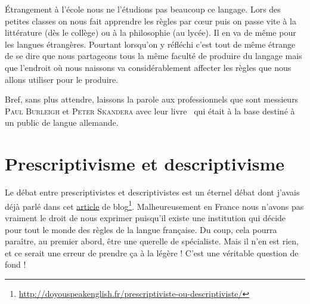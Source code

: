 \'Etrangement à l'école nous ne l'étudions pas beaucoup ce
 langage. Lors des petites classes on nous fait apprendre les règles
 par c{\oe}ur puis on passe vite à la littérature (dès le collège) ou
 à la philosophie (au lycée). Il en va de même pour les langues
 étrangères. Pourtant lorsqu'on y réfléchi c'est tout de même étrange
 de se dire que nous partageons tous la même faculté de produire du
 langage mais que l'endroit où nous naissons va considérablement
 affecter les règles que nous allons utiliser pour le produire.

 Bref, sans plus attendre, laissons la parole aux professionnels que sont
 messieurs \textsc{Paul Burleigh} et \textsc{Peter Skandera} avec leur
 livre~\cite{burleigh} qui était à la base destiné à un public de langue allemande.

\newpage
\minitoc
\newpage

\section{Prescriptivisme et descriptivisme}

Le débat entre prescriptivistes et descriptivistes est un éternel
débat dont j'avais déjà parlé dans cet
\href{http://doyouspeakenglish.fr/prescriptiviste-ou-descriptiviste/}{article}
de
blog\footnote{\url{http://doyouspeakenglish.fr/prescriptiviste-ou-descriptiviste/}}. Malheureusement
en France nous n'avons pas vraiment le droit de nous exprimer
puisqu'il existe une institution qui décide pour tout le monde des
règles de la langue française. Du coup, cela pourra paraître, au
premier abord, être une querelle de spécialiste. Mais il n'en est
rien, et ce serait une erreur de prendre ça à la légère ! C'est une
véritable question de fond !

\begin{center}
\begin{mdframed}[style=citestyle, frametitle={Extrait de~\cite{Burleigh}}]
\end{mdframed}  
\end{center}

